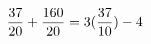 \documentclass[preview]{standalone}
\begin{document}
\begin{align*}
\special{dvisvgm:raw <g id='unique000'>}\frac{37}{20} + \frac{160}{20} = 3(\frac{37}{10}) - 4\special{dvisvgm:raw </g>}
\end{align*}
\end{document}
